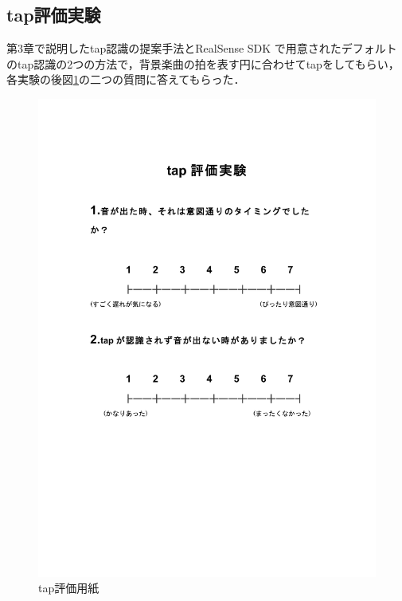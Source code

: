 \subsection{tap評価実験}
第3章で説明したtap認識の提案手法とRealSense SDK で用意されたデフォルトのtap認識の2つの方法で，背景楽曲の拍を表す円に合わせてtapをしてもらい，各実験の後図\ref{img:eval1}の二つの質問に答えてもらった．
\begin{figure}[ht]
	\begin{center}
		\includegraphics[width=1.0\linewidth]{part/06.Evaluation/tap.pdf}
		\caption{tap評価用紙}
		\label{img:eval1} 
	\end{center}
\end{figure}

